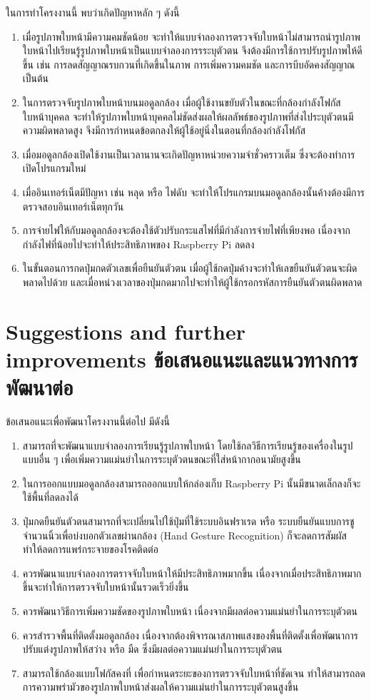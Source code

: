ในการทำโครงงานนี้ พบว่าเกิดปัญหาหลัก ๆ ดังนี้
\begin{enumerate}
    \item เมื่อรูปภาพใบหน้ามีความคมชัดน้อย จะทำให้แบบจำลองการตรวจจับใบหน้าไม่สามารถนำรูปภาพใบหน้าไปเรียนรู้รูปภาพใบหน้าเป็นแบบจำลองการรระบุตัวตน จึงต้องมีการใช้การปรับรูปภาพให้ดีขึ้น เช่น การลดสัญญาณรบกวนที่เกิดขึ้นในภาพ การเพิ่มความคมชัด 
    และการบีบอัดคงสัญญาณ เป็นต้น
    \item ในการตรวจจับรูปภาพใบหน้าบนมอดูลกล้อง เมื่อผู้ใช้งานขยับตัวในขณะที่กล้องกำลังโฟกัสใบหน้าบุคคล จะทำให้รูปภาพใบหน้าบุคคลไม่ชัดส่งผลให้ผลลัพธ์ของรูปภาพที่ส่งไประบุตัวตนมีความผิดพลาดสูง 
    จึงมีการกำหนดข้อตกลงให้ผู้ใช้อยู่นิ่งในตอนที่กล้องกำลังโฟกัส
    \item เมื่อมอดูลกล้องเปิดใช้งานเป็นเวลานานจะเกิดปัญหาหน่วยความจำชั่วคราวเต็ม ซึ่งจะต้องทำการเปิดโปรแกรมใหม่
    \item เมื่ออินเทอร์เน็ตมีปัญหา เช่น หลุด หรือ ไฟดับ จะทำให้โปรแกรมบนมอดูลกล้องนั้นค้างต้องมีการตรวจสอบอินเทอร์เน็ตทุกวัน
    \item การจ่ายไฟให้กับมอดูลกล้องจะต้องใช้ตัวปรับกระแสไฟที่มีกำลังการจ่ายไฟที่เพียงพอ เนื่องจากกำลังไฟที่น้อยไปจะทำให้ประสิทธิภาพของ Raspberry Pi ลดลง
    \item ในขั้นตอนการกดปุ่มกดตัวเลขเพื่อยืนยันตัวตน เมื่อผู้ใช้กดปุ่มค้างจะทำให้เลขยืนยันตัวตนจะผิดพลาดไปด้วย และเมื่อหน่วงเวลาของปุ่มกดมากไปจะทำให้ผู้ใช้กรอกรหัสการยืนยันตัวตนผิดพลาด
\end{enumerate}



\section{\ifenglish%
Suggestions and further improvements
\else%
ข้อเสนอแนะและแนวทางการพัฒนาต่อ
\fi
}

ข้อเสนอแนะเพื่อพัฒนาโครงงานนี้ต่อไป มีดังนี้
\begin{enumerate}
    \item สามารถที่จะพัฒนาแบบจำลองการเรียนรู้รูปภาพใบหน้า โดยใช้กลวิธีการเรียนรู้ของเครื่องในรูปแบบอื่น ๆ เพื่อเพิ่มความแม่นยำในการระบุตัวตนขณะที่ใส่หน้ากากอนามัยสูงขึ้น
    \item ในการออกแบบมอดูลกล้องสามารถออกแบบให้กล่องเก็บ Raspberry Pi นั้นมีขนาดเล็กลงก็จะใช้พื้นที่ลดลงได้
    \item ปุ่มกดยืนยันตัวตนสามารถที่จะเปลี่ยนไปใช้ปุ่มที่ใช้ระบบอินฟราเรด หรือ ระบบยืนยันแบบการชูจำนวนนิ้วเพื่อบ่งบอกตัวเลขผ่านกล้อง (Hand Gesture Recognition) ก็จะลดการสัมผัสทำให้ลดการแพร่กระจายของโรคติดต่อ 
    \item ควรพัฒนาแบบจำลองการตราจจับใบหน้าให้มีประสิทธิภาพมากขึ้น เนื่องจากเมื่อประสิทธิภาพมากขึ้นจะทำให้การตรวจจับใบหน้านั้นรวดเร็วยิ่งขึ้น
    \item ควรพัฒนาวิธีการเพิ่มความชัดของรูปภาพใบหน้า เนื่องจากมีผลต่อความแม่นยำในการระบุตัวตน
    \item ควรสำรวจพื้นที่ติดตั้งมอดูลกล้อง เนื่องจากต้องพิจารณาสภาพแสงของพื้นที่ติดตั้งเพื่อพัฒนาการปรับแต่งรูปภาพให้สว่าง หรือ มืด ซึ่งมีผลต่อความแม่นยำในการระบุตัวตน
    \item สามารถใช้กล้องแบบโฟกัสคงที่ เพื่อกำหนดระยะของการตรวจจับใบหน้าที่ชัดเจน ทำให้สามารถลดการความพร่ามัวของรูปภาพใบหน้าส่งผลให้ความแม่นยำในการระบุตัวตนสูงขึ้น 
\end{enumerate}
